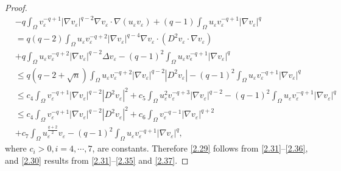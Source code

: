 \documentclass[12pt]{article}
\theoremstyle{plain}
\theoremstyle{definition}
\numberwithin{equation}{section}
\begin{document}
\begin{proof}
\begin{align}
        &-q\int_{\Omega}v_{\varepsilon}^{-q+1}|\nabla v_{\varepsilon}|^{q-2}\nabla v_{\varepsilon}\cdot\nabla (u_{\varepsilon}
        v_{\varepsilon})+(q-1)\int_{\Omega}u_{\varepsilon}v_{\varepsilon}^{-q+1}|\nabla v_{\varepsilon}|^{q}\nonumber\\
        &=q(q-2)\int_{\Omega}u_{\varepsilon}v_{\varepsilon}^{-q+2}|\nabla v_{\varepsilon}|^{q-4}\nabla
        v_{\varepsilon}\cdot(D^2v_{\varepsilon}\cdot\nabla v_{\varepsilon})\nonumber\\
        &+q\int_{\Omega}u_{\varepsilon}v_{\varepsilon}^{-q+2}|\nabla v_{\varepsilon}|^{q-2}\Delta
        v_{\varepsilon}-(q-1)^2\int_{\Omega}u_{\varepsilon}v_{\epsilon}^{-q+1}|\nabla v_{\varepsilon}|^{q}\nonumber\\
        &\leq q(q-2+\sqrt{n})\int_{\Omega}u_{\varepsilon}v_{\varepsilon}^{-q+2}|\nabla v_{\varepsilon}|^{q-2}|D^2v_{\varepsilon}|
        -(q-1)^2\int_{\Omega}u_{\varepsilon}v_{\varepsilon}^{-q+1}|\nabla v_{\varepsilon}|^{q}\nonumber\\
        &\leq c_4\int_{\Omega}v_{\varepsilon}^{-q+1}|\nabla
        v_{\varepsilon}|^{q-2}|D^2v_{\varepsilon}|^2+c_5\int_{\Omega}u_{\varepsilon}^2v_{\varepsilon}^{-q+3}|\nabla
        v_{\varepsilon}|^{q-2}-(q-1)^2\int_{\Omega}u_{\varepsilon}v_{\varepsilon}^{-q+1}|\nabla v_{\varepsilon}|^{q}\nonumber\\
        &\leq c_4\int_{\Omega}v_{\varepsilon}^{-q+1}|\nabla
        v_{\varepsilon}|^{q-2}|D^2v_{\varepsilon}|^2+c_6\int_{\Omega}v_{\varepsilon}^{-q-1}|\nabla v_{\varepsilon}|^{q+2}\nonumber\\
        &+c_7\int_{\Omega}u_{\varepsilon}^{\frac{q+2}{2}}v_{\varepsilon}-(q-1)^2\int_{\Omega}u_{\varepsilon}v_{\varepsilon}^{-q+1}|\nabla
        v_{\varepsilon}|^{q},
    \end{align}
    where $c_i>0, i=4,\cdots, 7$,  are constants. Therefore  \eqref{2.29} follows from \eqref{2.31}--\eqref{2.36}, and
    \eqref{2.30} results from \eqref{2.31}--\eqref{2.35} and \eqref{2.37}.
\end{proof}
\end{document}
